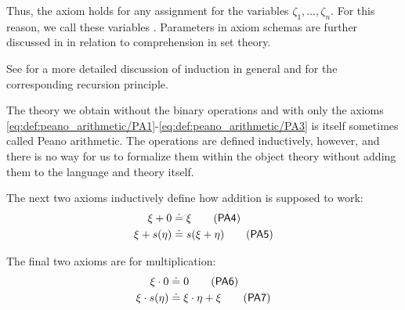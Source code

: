 \begin{definition}
\begin{thmenum}[resume=def:peano_arithmetic]
    Thus, the axiom holds for any assignment for the variables \( \zeta_1, \ldots, \zeta_n \). For this reason, we call these variables . Parameters in axiom schemas are further discussed in  in relation to comprehension in set theory.

    See  for a more detailed discussion of induction in general and  for the corresponding recursion principle.
  \end{thmenum}

  The theory we obtain without the binary operations and with only the axioms \eqref{eq:def:peano_arithmetic/PA1}-\eqref{eq:def:peano_arithmetic/PA3} is itself sometimes called Peano arithmetic. The operations are defined inductively, however, and there is no way for us to formalize them within the object theory without adding them to the language and theory itself.

  \begin{thmenum}[resume=def:peano_arithmetic]
     The next two axioms inductively define how addition is supposed to work:
    \begin{align}
      \xi + 0       &\doteq \xi           \label{eq:def:peano_arithmetic/PA4}\tag{\logic{PA4}} \\
      \xi + s(\eta) &\doteq s(\xi + \eta) \label{eq:def:peano_arithmetic/PA5}\tag{\logic{PA5}}
    \end{align}

     The final two axioms are for multiplication:
    \begin{align}
      \xi \cdot 0       &\doteq 0                    \label{eq:def:peano_arithmetic/PA6}\tag{\logic{PA6}} \\
      \xi \cdot s(\eta) &\doteq \xi \cdot \eta + \xi \label{eq:def:peano_arithmetic/PA7}\tag{\logic{PA7}}
    \end{align}
  \end{thmenum}
\end{definition}

